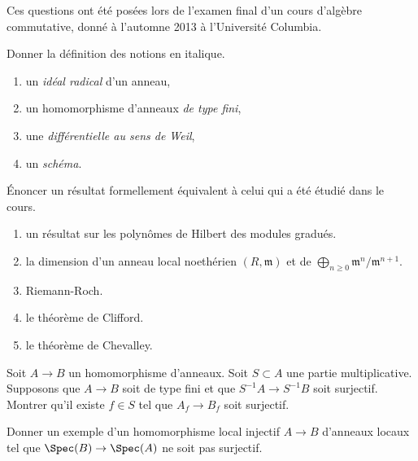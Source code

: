 \noindent
Ces questions ont été posées lors de l'examen final d'un cours
d'algèbre commutative, donné à l'automne 2013 à l'Université Columbia.

\begin{exercise}[Définitions]
\label{exercise-definitions-fall-2013}
Donner la définition des notions en italique.
\begin{enumerate}
\item un {\it idéal radical} d'un anneau,
\item un homomorphisme d'anneaux {\it de type fini},
\item une {\it différentielle au sens de Weil},
\item un {\it schéma}.
\end{enumerate}
\end{exercise}

\begin{exercise}[Résultats]
\label{exercise-results-fall-2013}
Énoncer un résultat formellement équivalent à celui qui a été étudié
dans le cours.
\begin{enumerate}
\item un résultat sur les polynômes de Hilbert des modules gradués.
\item la dimension d'un anneau local noethérien $(R, \mathfrak m)$ et de
$\bigoplus_{n \geq 0} \mathfrak m^n/\mathfrak m^{n + 1}$.
\item Riemann-Roch.
\item le théorème de Clifford.
\item le théorème de Chevalley.
\end{enumerate}
\end{exercise}

\begin{exercise}
\label{exercise-surjective-after-localization}
Soit $A \to B$ un homomorphisme d'anneaux. Soit $S \subset A$ une partie multiplicative.
Supposons que $A \to B$ soit de type fini et que $S^{-1}A \to S^{-1}B$ soit
surjectif. Montrer qu'il existe $f \in S$ tel que $A_f \to B_f$
soit surjectif.
\end{exercise}

\begin{exercise}
\label{exercise-injective-local-ring-map-not-surjective}
Donner un exemple d'un homomorphisme local injectif $A \to B$
d'anneaux locaux tel que $\Spec(B) \to \Spec(A)$ ne soit pas surjectif.
\end{exercise}

